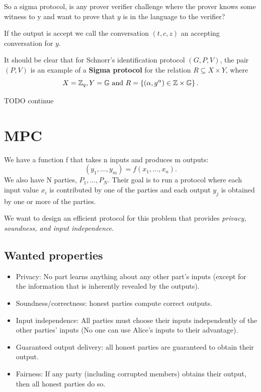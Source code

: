 \begin{remark}
So a sigma protocol, is any prover verifier challenge where the prover
knows some witness to y and want to prove that $y$ is in the language
to the verifier?
\end{remark}

If the output is accept we call the conversation $\left(t,c,z\right)$
an accepting conversation for $y$.
\begin{example}
It should be clear that for Schnorr\textquoteright s identification
protocol $\left(G,P,V\right)$, the pair $\left(P,V\right)$ is an
example of a \textbf{Sigma protocol} for the relation $R\subseteq X\times Y$,
where
\[
X=\mathbb{Z}_{q},Y=\mathbb{G}\text{ and }R=\left\{ \left(\alpha,g^{\alpha}\right)\in\mathbb{Z}\times\mathbb{G}\right\} .
\]

TODO continue
\end{example}


\chapter{MPC}
We have a function f that takes n inputs and produces m outputs:
$$  (y_1,...,y_m) = f(x_1,...,x_n).$$
We also have N parties, $P_1,...,P_N$. 
Their goal is to run a protocol where each input value $x_i$ is 
contributed by one of the parties and each output $y_j$ is obtained by one or more of
 the parties.


We want to design an efficient protocol for this problem that provides
\emph{ privacy, soundness, and input independence}.

\section{Wanted properties}
\begin{itemize}
  \item Privacy: No part learns anything about any other part's inputs
  (except for the information that is inherently revealed by the outputs).
  \item Soundness/correctness: honest parties compute correct outputs. 
  \item Input independence: All parties must choose their 
  inputs independently of the other parties' inputs 
  (No one can use Alice's inputs to their advantage).
  \item Guaranteed output delivery: all honest parties are guaranteed to obtain
  their output.
  \item Fairness: If any party (including corrupted members) obtains their output, 
  then all honest parties do so.
\end{itemize}
